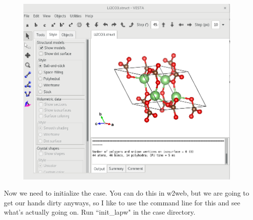 \documentclass[12pt]{article}
\begin{document}
	\begin{figure}[H]
	\includegraphics[scale=0.4]{./images/Li2CO3_struct.png}
\end{figure}


Now we need to initialize the case.  You can do this in w2web, but we are going to get our hands dirty anyways, so I like to use the command line for this and see what's actually going on.  Run ``init\_lapw" in the case directory.
\end{document}
